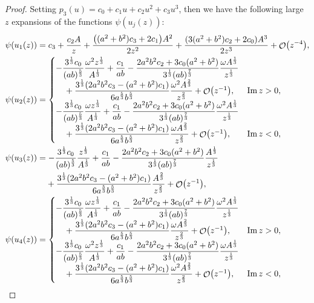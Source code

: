 \documentclass[10pt,a4paper]{amsart}
\DeclareMathOperator{\OO}{\mathcal{O}}
\numberwithin{equation}{section}
\begin{document}
\begin{proof}
Setting $p_3(u) = c_0 + c_1 u + c_2 u^2 + c_3u^3$, then we have the following large $z$ expansions of the
functions $\psi(u_j(z))$:
 \begin{align*}
 &\psi (u_1(z)) = c_3 + \frac{c_2 A}{z} + \frac{\bigl((a^2+b^2)c_3 + 2c_1\bigr)A^2}{2z^2} + \frac{(3(a^2 + b^2)c_2 + 2c_0)A^3}{2z^3} + \OO\bigl(z^{-4}\bigr),\\
 &\psi (u_2(z)) =
 \begin{cases}
 -\dfrac{ 3^{\frac{1}{3}} c_0}{(ab)^{\frac{5}{3}}} \dfrac{\omega^2z^{\frac{1}{3}}}{A^{\frac{1}{3}}} + \dfrac{c_1}{ab} - \dfrac{2a^2b^2c_2 + 3c_0(a^2+b^2)}{3^{\frac{1}{3}}(ab)^{\frac{7}{3}}} \dfrac{\omega A^{\frac{1}{3}}}{ z^{\frac{1}{3}}}&\\
 \quad{} + \dfrac{3^{\frac{1}{3}}(2a^2b^2c_3 - (a^2 + b^2)c_1)}{6a^{\frac{5}{3}}b^{\frac{5}{3}}} \dfrac{\omega^2A^{\frac{2}{3}}}{z^{\frac{2}{3}}} + \OO\bigl(z^{-1}\bigr), &\operatorname{Im}z >0,\\
 -\dfrac{ 3^{\frac{1}{3}} c_0}{(ab)^{\frac{5}{3}}} \dfrac{\omega z^{\frac{1}{3}}}{A^{\frac{1}{3}}} + \dfrac{c_1}{ab} - \dfrac{2a^2b^2c_2 + 3c_0(a^2+b^2)}{3^{\frac{1}{3}}(ab)^{\frac{7}{3}}} \dfrac{\omega^2A^{\frac{1}{3}}}{ z^{\frac{1}{3}}} &\\
 \quad{}+ \dfrac{3^{\frac{1}{3}}(2a^2b^2c_3 - (a^2 + b^2)c_1)}{6a^{\frac{5}{3}}b^{\frac{5}{3}}} \dfrac{\omega A^{\frac{2}{3}}}{z^{\frac{2}{3}}} + \OO\bigl(z^{-1}\bigr), &\operatorname{Im}z <0,
 \end{cases}\\
 &\psi(u_3(z)) = -\frac{ 3^{\frac{1}{3}} c_0}{(ab)^{\frac{5}{3}}} \frac{z^{\frac{1}{3}}}{A^{\frac{1}{3}}} + \frac{c_1}{ab} - \frac{2a^2b^2c_2 + 3c_0(a^2+b^2)}{3^{\frac{1}{3}}(ab)^{\frac{7}{3}}} \frac{A^{\frac{1}{3}}}{z^{\frac{1}{3}}}\\
 &\hphantom{\psi(u_3(z)) =}{}
 + \frac{3^{\frac{1}{3}}(2a^2b^2c_3 - (a^2 + b^2)c_1)}{6a^{\frac{5}{3}}b^{\frac{5}{3}}} \frac{A^{\frac{2}{3}}}{z^{\frac{2}{3}}} + \OO\bigl(z^{-1}\bigr),\\
 &\psi(u_4(z)) =
 \begin{cases}
 -\dfrac{ 3^{\frac{1}{3}} c_0}{(ab)^{\frac{5}{3}}} \dfrac{\omega z^{\frac{1}{3}}}{A^{\frac{1}{3}}} + \dfrac{c_1}{ab} - \dfrac{2a^2b^2c_2 + 3c_0(a^2+b^2)}{3^{\frac{1}{3}}(ab)^{\frac{7}{3}}} \dfrac{\omega^2A^{\frac{1}{3}}}{ z^{\frac{1}{3}}} &\\
 \quad{}+ \dfrac{3^{\frac{1}{3}}(2a^2b^2c_3 - (a^2 + b^2)c_1)}{6a^{\frac{5}{3}}b^{\frac{5}{3}}} \dfrac{\omega A^{\frac{2}{3}}}{z^{\frac{2}{3}}} + \OO\bigl(z^{-1}\bigr), &\operatorname{Im}z >0,\\
 -\dfrac{ 3^{\frac{1}{3}} c_0}{(ab)^{\frac{5}{3}}} \dfrac{\omega^2z^{\frac{1}{3}}}{A^{\frac{1}{3}}} + \dfrac{c_1}{ab} - \dfrac{2a^2b^2c_2 + 3c_0(a^2+b^2)}{3^{\frac{1}{3}}(ab)^{\frac{7}{3}}} \dfrac{\omega A^{\frac{1}{3}}}{ z^{\frac{1}{3}}} &\\
 \quad{}+ \dfrac{3^{\frac{1}{3}}(2a^2b^2c_3 - (a^2 + b^2)c_1)}{6a^{\frac{5}{3}}b^{\frac{5}{3}}} \dfrac{\omega^2A^{\frac{2}{3}}}{z^{\frac{2}{3}}} + \OO\bigl(z^{-1}\bigr), &\operatorname{Im}z <0,
 \end{cases}
 \end{align*}


\end{proof}
\end{document}
